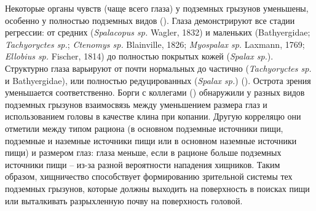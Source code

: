
Некоторые органы чувств (чаще всего глаза) у подземных грызунов уменьшены, особенно у полностью подземных видов (\cite{REICHMAN1990}). Глаза демонстрируют все стадии регрессии: от средних (\textit{Spalacopus sp.} Wagler, 1832) и маленьких (Bathyergidae; \textit{Tachyoryctes sp.}; \textit{Ctenomys sp.} Blainville, 1826; \textit{Myospalax sp.} Laxmann, 1769; \textit{Ellobius sp.} Fischer, 1814) до полностью покрытых кожей (\textit{Spalax sp.}). Структурно глаза варьируют от почти нормальных до частично (\textit{Tachyoryctes sp.} и Bathyergidae), или полностью редуцированных (\textit{Spalax sp.}) (\cite{Nevo1990}). Острота зрения уменьшается соответственно. Борги с коллегами (\cite{Borghi2002}) обнаружили у разных видов подземных грызунов взаимосвязь между уменьшением размера глаз и использованием головы в качестве клина при копании. Другую корреляцю они отметили между типом рациона (в основном подземные источники пищи, подземные и наземные источники пищи или в основном наземные источники пищи) и размером глаз: глаза меньше, если в рационе больше подземных источники пищи -- из-за разной вероятности нападения хищников. Таким образом, хищничество способствует формированию зрительной системы тех подземных грызунов, которые должны выходить на поверхность в поисках пищи или выталкивать разрыхленную почву на поверхность головой.




